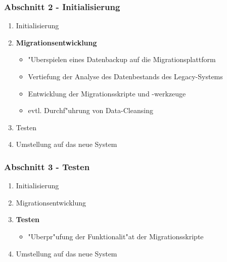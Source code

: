 \documentclass{beamer}
\begin{document}
	\begin{frame}
		\frametitle{Abschnitt 2 - Initialisierung}
		
		\begin{enumerate}
			\item Initialisierung
			
			\item \textbf{Migrationsentwicklung}
			\begin{itemize}
				\item "Uberspielen eines Datenbackup auf die Migrationsplattform
				\item Vertiefung der Analyse des Datenbestands des Legacy-Systems
				\item Entwicklung der Migrationsskripte und -werkzeuge
				\item evtl. Durchf"uhrung von Data-Cleansing
			\end{itemize}
			
			\item Testen
			
			\item Umstellung auf das neue System
			
		\end{enumerate}
	\end{frame}
	
	\begin{frame}
		\frametitle{Abschnitt 3 - Testen}
		
		\begin{enumerate}
			\item Initialisierung
			
			\item Migrationsentwicklung
			
			\item \textbf{Testen}
			\begin{itemize}
				\item "Uberpr"ufung der Funktionalit"at der Migrationsskripte
			\end{itemize}
			
			\item Umstellung auf das neue System
			
		\end{enumerate}
	\end{frame}
	
\end{document}
